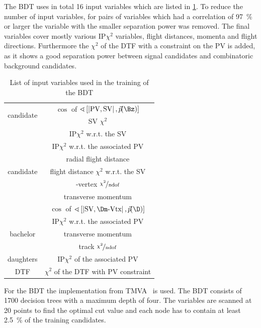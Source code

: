 The \ac{BDT} uses in total \num{16} input variables which are listed in \cref{tab:BDTInput}.
To reduce the number of input variables, for pairs of variables which had a correlation of \SI{97}{\percent} or larger the variable with the smaller separation power was removed.
The final variables cover mostly various $\text{IP}\chi^2$ variables, flight distances, momenta and flight directions.
Furthermore the $\chi^2$ of the DTF with a constraint on the \ac{PV} is added, as it shows a good separation power between \BdToDpi signal candidates and combinatoric background candidates.
\begin{table}[tbp]
	\centering
	\caption{List of input variables used in the training of the BDT}
	\begin{tabular}{cc}
		\toprule
		\multirow{2}{*}{\Bz candidate}	& $\cos$ of $\sphericalangle\left[\left|\text{PV},\text{SV}\right|,\vec{p}\!(\Bz)\right]$ \\
										& \ac{SV} $\chi^2$\\
		\midrule
		\multirow{7}{*}{\Dm candidate}	& $\text{IP}\chi^2$ w.r.t. the \ac{SV}\\
										& $\text{IP}\chi^2$ w.r.t. the associated PV\\
										& radial flight distance\\
										& flight distance $\chi^2$ w.r.t. the \ac{SV}\\
										& \Dm-vertex $\nicefrac{\chi^2}{\text{ndof}}$\\
										& transverse momentum \pt \\
										& $\cos$ of $\sphericalangle\left[\left|\text{SV},\Dm\text{-Vtx}\right|,\vec{p}\!(\D)\right]$ \\
		\midrule
		\multirow{3}{*}{bachelor \pion}	& $\text{IP}\chi^2$ w.r.t. the associated PV\\
										& transverse momentum \pt\\
										& track $\nicefrac{\chi^2}{\text{ndof}}$\\
		\midrule
		\Dm daughters					& $\text{IP}\chi^2$ of the associated \ac{PV}\\
		\midrule
		DTF 							& $\chi^2$ of the DTF with \ac{PV} constraint \\
		\bottomrule
	\end{tabular}
	\label{tab:BDTInput}
\end{table}
For the \ac{BDT} the implementation from TMVA~\cite{Hocker:2007ht} is used.
The \ac{BDT} consists of \num{1700} decision trees with a maximum depth of four.
The variables are scanned at \num{20} points to find the optimal cut value and each node has to contain at least \SI{2.5}{\percent} of the training candidates.
